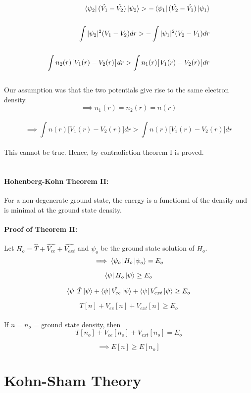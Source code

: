 \documentclass[12pt]{article}
\begin{document}
\begin{align*}
    \bra{\psi_2} (\hat{V_1} - \hat{V_2}) \ket{\psi_2} > -\bra{\psi_1} (\hat{V_2} - \hat{V_1}) \ket{\psi_1} \\
    \\
    \int |\psi_2|^2 (V_1 - V_2) dr > - \int |\psi_1|^2 (V_2 - V_1) dr\\
    \\
    \int n_2 (r) \big[V_1 (r) - V_2 (r) \big] dr > \int n_1 (r) \big[V_1 (r) - V_2 (r) \big] dr
\end{align*}
\\
Our assumption was that the two potentials give rise to the same electron density. 
\[ \implies n_1 (r) = n_2 (r) = n(r)\]
\\
\[ \implies \int n(r) \big[V_1 (r) - V_2 (r) \big] dr > \int n(r) \big[V_1 (r) - V_2 (r) \big] dr\]
\\
This cannot be true. Hence, by contradiction theorem I is proved. 
\\
\\
\paragraph{Hohenberg-Kohn Theorem II:}
For a non-degenerate ground state, the energy is a functional of the density and is minimal at the ground state density. 

\paragraph{Proof of Theorem II:} 

Let $H_o = \hat{T} + \hat{V_{ee}} + \hat{V_{ext}}$ and $\psi_o$ be the ground state solution of $H_o$.
\\
\[ \implies \bra{\psi_o} H_o \ket{\psi_o} = E_o \]

\[\bra{\psi} H_o \ket{\psi} \geq E_o \]

\[ \bra{\psi} \hat{T} \ket{\psi} + \bra{\psi} \hat{V_{ee}} \ket{\psi} + \bra{\psi} \hat{V_{ext}} \ket{\psi} \geq E_o \]

\[ T[n] + V_{ee} [n] + V_{ext} [n] \geq E_o \]
\\
If $n = n_o$ = ground state density, then
\\
\[ T[n_o] + V_{ee} [n_o] + V_{ext} [n_o] = E_o \]

\[ \implies E[n] \geq E[n_o] \]

\section{Kohn-Sham Theory}
\end{document}
